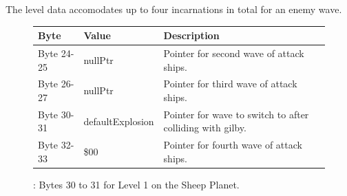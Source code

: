 The level data accomodates up to four incarnations in total for an enemy wave.

\begin{figure}[H]

  {
    \setlength{\tabcolsep}{3.0pt}
    \setlength\cmidrulewidth{\heavyrulewidth} %
    \begin{adjustbox}{width=13cm}

      \begin{tabular}{lll}
        \toprule
        Byte    & Value                     & Description                                                        \\
        \midrule
 Byte 24-25 & nullPtr\index{nullPtr}                   & Pointer for second wave of attack ships.                            \\
 Byte 26-27 & nullPtr\index{nullPtr}                   & Pointer for third wave of attack ships.                             \\
 Byte 30-31 & defaultExplosion\index{defaultExplosion}          & Pointer for  wave to switch to after colliding\index{colliding} with gilby.          \\
 Byte 32-33 & \$00                       & Pointer for fourth wave of attack ships.                            \\
        \bottomrule
      \end{tabular}
    \end{adjustbox}
  }\caption{: Bytes 30 to 31 for Level 1 on the Sheep Planet.}
\end{figure}


